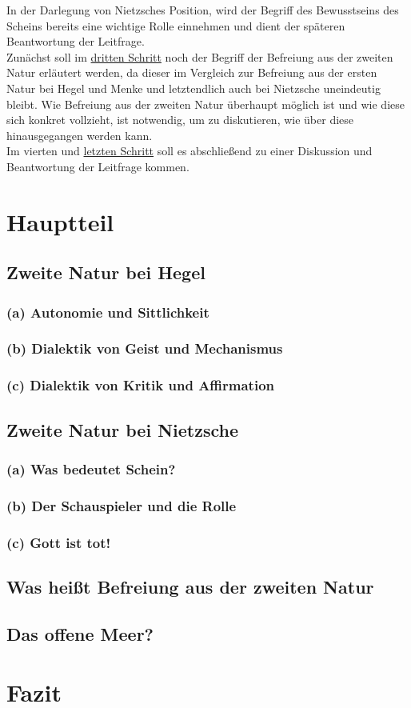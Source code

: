 \documentclass[12pt, a4paper, openany]{report}
\makeatletter
\newcommand\backmatter{ \if@openright \cleardoublepage \else \clearpage \fi }
\makeatother
\begin{document}
In der Darlegung von Nietzsches Position, wird der Begriff des Bewusstseins des Scheins bereits eine wichtige Rolle einnehmen und dient der späteren Beantwortung der Leitfrage.\\
Zunächst soll im \hyperref[abschnitt_3]{dritten Schritt} noch der Begriff der Befreiung aus der zweiten Natur erläutert werden, da dieser im Vergleich zur Befreiung aus der ersten Natur bei Hegel und Menke und letztendlich auch bei Nietzsche uneindeutig bleibt.
Wie Befreiung aus der zweiten Natur überhaupt möglich ist und wie diese sich konkret vollzieht, ist notwendig, um zu diskutieren, wie über diese hinausgegangen werden kann.\\
Im vierten und \hyperref[abschnitt_4]{letzten Schritt} soll es abschließend zu einer Diskussion und Beantwortung der Leitfrage kommen. 


\chapter{Hauptteil}
\section{Zweite Natur bei Hegel}\label{abschnitt_1}
\subsection{(a) Autonomie und Sittlichkeit}
\subsection{(b) Dialektik von Geist und Mechanismus}
\subsection{(c) Dialektik von Kritik und Affirmation}
\section{Zweite Natur bei Nietzsche}\label{abschnitt_2}
\subsection{(a) Was bedeutet Schein?}
\subsection{(b) Der Schauspieler und die Rolle}
\subsection{(c) Gott ist tot!}
\section{Was heißt Befreiung aus der zweiten Natur}\label{abschnitt_3}
\section{Das offene Meer?}\label{abschnitt_4}

\chapter{Fazit}

\backmatter

\printbibliography
 
\end{document}
